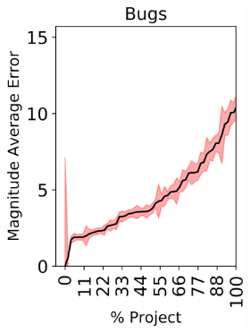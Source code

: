 \begin{figure}[tp!]
\begin{subfigure}[t]{\linewidth}
\begin{subfigure}[t]{0.33\linewidth}
	\includegraphics[width=\linewidth]{images/RQ1/opensrc/Bugs.png}
	\end{subfigure}%
	~
	\centering
	\begin{subfigure}[t]{0.33\linewidth}
		\centering

\end{subfigure}
\end{subfigure}
\end{figure}
